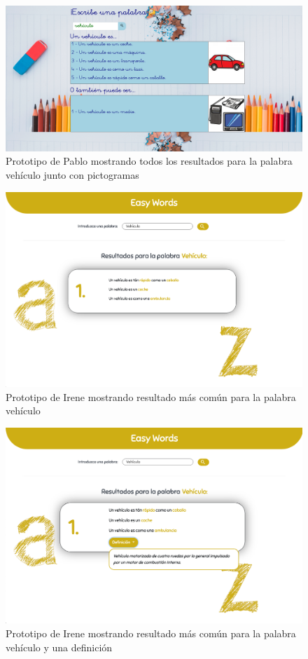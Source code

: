 \begin{figure}[!t]
	\includegraphics[width=.8\textwidth]{Imagenes/Bitmap/Mockups/mockup4_pablo}
	\centering
	\caption{Prototipo de Pablo mostrando todos los resultados para la palabra vehículo junto con pictogramas}
	\label{fig:mockup4pablo}
\end{figure}

\begin{figure}[!t]
	\includegraphics[width=.8\textwidth]{Imagenes/Bitmap/Mockups/mockup1_irene_inicial.png}
	\centering
	\caption{Prototipo de Irene mostrando resultado más común para la palabra vehículo}
	\label{fig:mockup1irene_vInicial}
\end{figure}

\begin{figure}[!t]
	\includegraphics[width=.8\textwidth]{Imagenes/Bitmap/Mockups/mockup2_irene_inicial.png}
	\centering
	\caption{Prototipo de Irene mostrando resultado más común para la palabra vehículo y una definición}
	\label{fig:mockup2irene_vInicial}
\end{figure}

